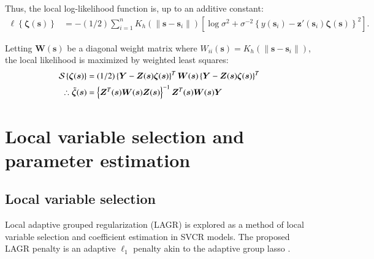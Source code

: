 \documentclass[authoryear, review, 11pt]{elsarticle}
\begin{document}
    Thus, the local log-likelihood function is, up to an additive constant: 
    \begin{align}\label{eq:local-log-likelihood}
		\ell \left\{ \bm{\zeta}(\bm{s}) \right\} &= -(1/2) \sum_{i=1}^n K_h( \| \bm{s} - \bm{s}_i \| ) \left[ \log{\sigma^2}  + \sigma^{-2}  \left\{ y(\bm{s}_i) - \bm{z}'(\bm{s}_i) \bm{\zeta}(\bm{s}) \right\}^2 \right].
    \end{align}
  
    Letting $\bm{W}(\bm{s})$ be a diagonal weight matrix where $W_{ii}(\bm{s}) = K_h( \| \bm{s} - \bm{s}_i \| )$, the local likelihood is maximized by weighted least squares:
    \begin{align}\label{eq:zeta-hat}
        \mathcal{S} \left\{ \bm{\zeta} (\bm{s}) \right\} &= (1/2) \left\{ \bm{Y} - \bm{Z}(\bm{s}) \bm{\zeta} (\bm{s}) \right\}^T \bm{W}(\bm{s}) \left\{ \bm{Y} - \bm{Z}(\bm{s}) \bm{\zeta} (\bm{s}) \right\}^T \notag \\
        \therefore \tilde{\bm{\zeta}}(\bm{s}) &= \left\{ \bm{Z}^T(\bm{s}) \bm{W}(\bm{s}) \bm{Z}(\bm{s}) \right\}^{-1} \bm{Z}^T(\bm{s}) \bm{W}(\bm{s}) \bm{Y}
    \end{align}


    
	 

\section{Local variable selection and parameter estimation \label{section:model-selection}}
	\subsection{Local variable selection}
	Local adaptive grouped regularization (LAGR) is explored as a method of local variable selection and coefficient estimation in SVCR models. The proposed LAGR penalty is an adaptive $\ell_1$ penalty akin to the adaptive group lasso \citep{Wang-Leng-2008,Zou:2006}.
\end{document}
